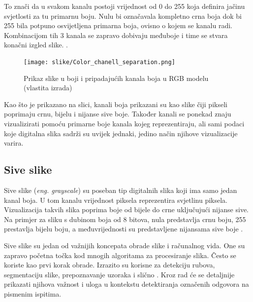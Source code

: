 \documentclass{foi}
\begin{document}
To znači da u svakom kanalu postoji vrijednost od 0 do 255 koja definira jačinu svjetlosti za tu primarnu boju. Nulu bi označavala kompletno crna boja dok bi 255 bila potpuno osvijetljena primarna boja,  ovisno o kojem se kanalu radi. Kombinacijom tih 3 kanala se zapravo dobivaju međuboje i time se stvara konačni izgled slike. \cite{GrayscaleSlika}.

\begin{figure}[H]
    \centering
    \texttt{[image: slike/Color\_chanell\_separation.png]}
    \caption{Prikaz slike u boji i pripadajućih kanala boja u RGB modelu (vlastita izrada)}
    \label{fig:channels}
\end{figure}

Kao što je prikazano na slici, kanali boja prikazani su kao slike čiji pikseli poprimaju crnu, bijelu i nijanse sive boje. Također kanali se ponekad znaju vizualizirati pomoću primarne boje kanala kojeg reprezentiraju, ali sami podaci koje digitalna slika sadrži su uvijek jednaki, jedino način njihove vizualizacije varira. 

\subsection{Sive slike}

Sive slike (\textit{eng. grayscale}) su poseban tip digitalnih slika koji ima samo jedan kanal boja. U tom kanalu vrijednost piksela reprezentira svjetlinu piksela. Vizualizacija takvih slika poprima boje od bijele do crne uključujući nijanse sive. Na primjer za sliku s dubinom boja od 8 bitova, nula predstavlja crnu boju, 255 prestavlja bijelu boju, a međuvrijednosti su predstavljene nijansama sive boje \cite{GrayscaleSlika}.

Sive slike su jedan od važnijih koncepata obrade slike i računalnog vida. One su zapravo početna točka kod mnogih algoritama za procesiranje slika. Često se koriste kao prvi korak obrade. Izrazito su korisne za detekciju rubova, segmentaciju slike, prepoznavanje uzoraka i slično \cite{Grayscale2}. Kroz rad će se detaljnije prikazati njihova važnost i uloga u kontekstu detektiranja označenih odgovora na pismenim ispitima. 
\end{document}
